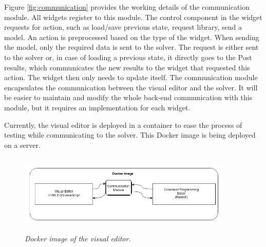 \documentclass[a4paper]{article}
\begin{document}
Figure \ref{fig:communication} provides the working details of the communication module. All widgets register to this module. The control component in the widget requests for action, such as load/save previous state, request library, send a model. An action is preprocessed based on the type of the widget. When sending the model, only the required data is sent to the solver. The request is either sent to the solver or, in case of loading a previous state, it directly goes to the Post results, which communicates the new results to the widget that requested this action. The widget then only needs to update itself. The communication module encapsulates the communication between the visual editor and the solver. It will be easier to maintain and modify the whole back-end communication with this module, but it requires an implementation for each widget.

Currently, the visual editor is deployed in a container to ease the process of testing while communicating to the solver. This Docker image is being deployed on a server.

\begin{figure}
\begin{center}
\includegraphics[height=1.5in,width=4in]{img/e2e.png}
\caption{\small \sl Docker image of the visual editor.\label{fig:e2e}}
\end{center}
\end{figure}
\end{document}
